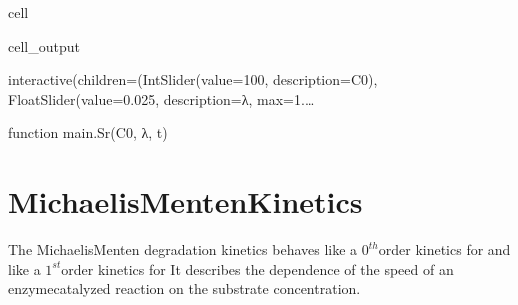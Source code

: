 \documentclass[letterpaper,10pt,english]{jupyterBook}
\begin{document}
\begin{sphinxuseclass}{cell}
\begin{sphinxVerbatimOutput}
\begin{sphinxuseclass}{cell_output}
\begin{sphinxVerbatim}[commandchars=\\\{\}]
interactive(children=(IntSlider(value=100, description=\PYGZsq{}C0\PYGZsq{}), FloatSlider(value=0.025, description=\PYGZsq{}λ\PYGZsq{}, max=1.…
\end{sphinxVerbatim}

\begin{sphinxVerbatim}[commandchars=\\\{\}]
\PYGZlt{}function \PYGZus{}\PYGZus{}main\PYGZus{}\PYGZus{}.Sr(C0, λ, t)\PYGZgt{}
\end{sphinxVerbatim}

\end{sphinxuseclass}\end{sphinxVerbatimOutput}

\end{sphinxuseclass}

\section{Michaelis\sphinxhyphen{}Menten\sphinxhyphen{}Kinetics}
\label{\detokenize{content/tools/Kinetics_degradation:michaelis-menten-kinetics}}
\sphinxAtStartPar
The Michaelis\sphinxhyphen{}Menten degradation kinetics behaves like a \(0^{th}\)\sphinxhyphen{}order kinetics for  and like a \(1^{st}\)\sphinxhyphen{}order kinetics for  It describes the dependence of the speed of an enzyme\sphinxhyphen{}catalyzed reaction on the substrate concentration.
\end{document}

